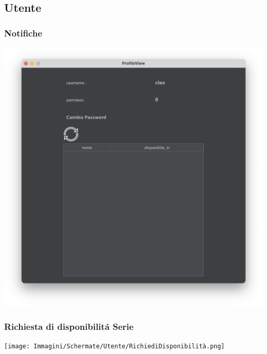 \subsection{Utente}
\subsubsection{Notifiche}
\includegraphics[scale=0.25, center]{Immagini/Schermate/Utente/NotificheUtente.png}
\subsubsection{Richiesta di disponibilit\'a Serie}
\texttt{[image: Immagini/Schermate/Utente/RichiediDisponibilità.png]}

